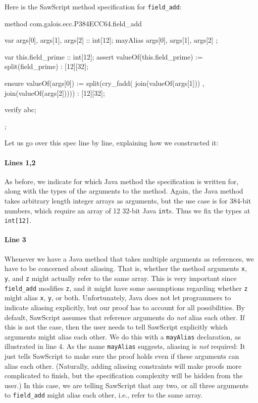 \documentclass[12pt]{galois-whitepaper}
\newcommand{\sawScript}{{\sc SawScript}\xspace}
\begin{document}
Here is the \sawScript method specification for {\tt field\_add}:
\begin{code}[numbers=left]
  method com.galois.ecc.P384ECC64.field_add {
    var args[0], args[1], args[2] :: int[12];
    mayAlias { args[0], args[1], args[2] };
  
    var this.field_prime :: int[12];
    assert valueOf(this.field_prime) := split(field_prime) : [12][32];
  
    ensure valueOf(args[0]) := 
        split(cry_fadd( join(valueOf(args[1]))
                      , join(valueOf(args[2])))) : [12][32];
  
    verify abc;
  };
\end{code}
Let us go over this spec line by line, explaining how we constructed it:

\paragraph{Lines 1,2} As before, we indicate for which Java method the specification is written for, along with the types of the
arguments to the method. Again, the Java method takes arbitrary length integer arrays as arguments, but the use case
is for 384-bit numbers, which require an array of 12 32-bit Java {\tt int}s. Thus we fix the types at {\tt int[12]}.

\paragraph{Line 3} Whenever we have a Java method that takes multiple arguments as references, we have to be
concerned about aliasing. That is, whether the method arguments {\tt x}, {\tt y}, and {\tt z} might actually refer
to the same array. This is very important since {\tt field\_add} modifies {\tt z}, and it might have some
assumptions regarding whether {\tt z} might alias {\tt x}, {\tt y}, or both. Unfortunately, Java does not let programmers
to indicate aliasing explicitly, but our proof has to account for all possibilities.
By default, \sawScript assumes that reference arguments do {\em not} alias each other.
If this is not the case, then the user needs to tell \sawScript explicitly which arguments might alias each other. We do
this with a {\tt mayAlias} declaration, as illustrated in line 4. As the name {\tt mayAlias}
suggests, aliasing is {\em not} required: It just tells \sawScript to make sure the proof holds even if these arguments
can alias each other. (Naturally, adding aliasing constraints will make proofs more complicated to finish, but the specification complexity
will be hidden from the user.) In this case, we are telling
\sawScript that any two, or all three arguments to {\tt field\_add} might alias each other, i.e., refer to the same array.
\end{document}
